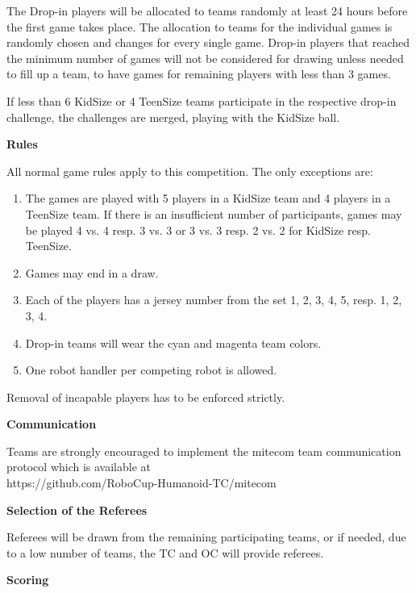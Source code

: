 \bigskip

The Drop-in players will be allocated to teams randomly at least 24 hours before the first game takes place. The allocation to teams for the individual games is randomly chosen and changes for every single game. Drop-in players that reached the minimum number of games will not be considered for drawing unless needed to fill up a team, to have games for remaining players with less than 3 games.

If less than 6 KidSize or 4 TeenSize teams participate in the respective drop-in challenge, the challenges are merged, playing with the KidSize ball.

\bigskip

{\bfseries Rules}

All normal game rules apply to this competition. The only exceptions are:
\begin{enumerate}
\item The games are played with 5 players in a KidSize team and 4 players in a TeenSize team. If there is an insufficient number of participants, games may be played 4 vs. 4 resp. 3 vs. 3 or 3 vs. 3 resp. 2 vs. 2 for KidSize resp. TeenSize.
\item Games may end in a draw.
\item Each of the players has a jersey number from the set {1, 2, 3, 4, 5}, resp. {1, 2, 3, 4}.
\item Drop-in teams will wear the cyan and magenta team colors.
\item One robot handler per competing robot is allowed.
\end{enumerate}

Removal of incapable players has to be enforced strictly.

\bigskip
 
{\bfseries Communication}

Teams are strongly encouraged to implement the mitecom team communication protocol which is available at \\
\textcolor[rgb]{0.0,0.0,0.49803922}{https://github.com/RoboCup-Humanoid-TC/mitecom}

\bigskip
 
{\bfseries Selection of the Referees}

Referees will be drawn from the remaining participating teams, or if needed, due to a low number of teams, the TC and OC will provide referees.

\bigskip
 
{\bfseries Scoring}

